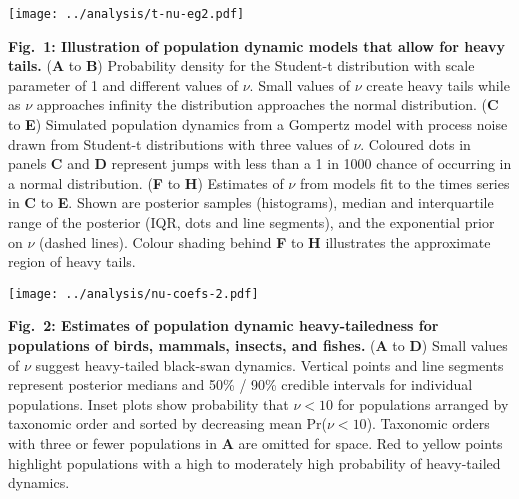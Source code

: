 
\clearpage


\begin{center}
\texttt{[image: ../analysis/t-nu-eg2.pdf]}
\end{center}

\textbf{Fig.~1: Illustration of population dynamic models that allow for heavy
tails.} (\textbf{A} to \textbf{B}) Probability density for the Student-t
distribution with scale parameter of 1 and different values of \(\nu\). Small
values of \(\nu\) create heavy tails while as \(\nu\) approaches infinity the
distribution approaches the normal distribution. (\textbf{C} to \textbf{E})
Simulated population dynamics from a Gompertz model with process noise drawn
from Student-t distributions with three values of \(\nu\). Coloured dots in
panels \textbf{C} and \textbf{D} represent jumps with less than a 1 in 1000
chance of occurring in a normal distribution. (\textbf{F} to \textbf{H})
Estimates of \(\nu\) from models fit to the times series in \textbf{C} to
\textbf{E}. Shown are posterior samples (histograms), median and interquartile
range of the posterior (IQR, dots and line segments), and the exponential prior
on \(\nu\) (dashed lines). Colour shading behind \textbf{F} to \textbf{H}
illustrates the approximate region of heavy tails.

\clearpage

\begin{center}
\texttt{[image: ../analysis/nu-coefs-2.pdf]}
\end{center}

\textbf{Fig.~2: Estimates of population dynamic heavy-tailedness for
populations of birds, mammals, insects, and fishes.} (\textbf{A} to \textbf{D})
Small values of \(\nu\) suggest heavy-tailed black-swan dynamics. Vertical
points and line segments represent posterior medians and 50\% / 90\% credible
intervals for individual populations. Inset plots show probability that \(\nu
< 10\) for populations arranged by taxonomic order and sorted by decreasing
mean Pr(\(\nu < 10\)). Taxonomic orders with three or fewer populations in
\textbf{A} are omitted for space. Red to yellow points highlight populations
with a high to moderately high probability of heavy-tailed dynamics.


